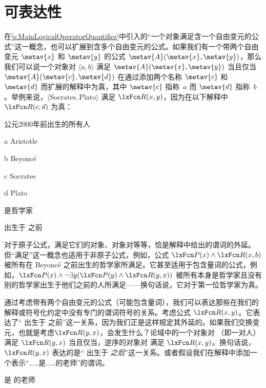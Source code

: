 \section{可表达性}

在\cref{s:MainLogicalOperatorQuantifier}中引入的“一个对象满足含一个自由变元的公式”这一概念，也可以扩展到含多个自由变元的公式。如果我们有一个带两个自由变元
$\metav{x}$ 和 $\metav{y}$ 的公式 $\metav{A}(\metav{x},\metav{y})$，那么我们可以说一个对象对
$\langle a, b\rangle$ 满足 $\metav{A}(\metav{x},\metav{y})$
当且仅当$\metav{A}(\metav{c},\metav{d})$ 在通过添加两个名称 $\metav{c}$ 和 $\metav{d}$ 而扩展的解释中为真，其中 $\metav{c}$ 指称~$a$ 而 $\metav{d}$ 指称~$b$。举例来说，$\langle \text{Socrates}, \text{Plato}\rangle$ 满足
$\atom{R}{x,y}$，因为在以下解释中 $\atom{R}{c,d}$ 为真：

\begin{ekey}
	\item[\text{论域}] 公元2000年前出生的所有人
	\item[a] Aristotle
	\item[b] Beyonc\'e
	\item[c] Socrates
	\item[d] Plato
	\item[\atom{P}{x}]  是哲学家
	\item[\atom{R}{x,y}]  出生于  之前
\end{ekey}


对于原子公式，满足它们的对象、对象对等等，恰是解释中给出的谓词的外延。但“满足”这一概念也适用于非原子公式，例如，公式 $\atom{P}{x} \land \atom{R}{x,b}$ 被所有在 Beyonc\'e 之前出生的哲学家所满足。它甚至适用于包含量词的公式，例如，$\atom{P}{x} \eand \lnot\exists y(\atom{P}{y} \land \atom{R}{y,x})$ 被所有本身是哲学家且没有别的哲学家出生于他们之前的人所满足——换句话说，它对于第一位哲学家为真。

通过考虑带有两个自由变元的公式（可能包含量词），我们可以表达那些在我们的解释或符号化约定中没有专门的谓词符号的关系。考虑公式 $\atom{R}{x,y}$。它表达了“ 出生于  之前”这一关系，因为我们正是这样规定其外延的。如果我们交换变元，也就是考虑$\atom{R}{y,x}$，会发生什么？论域中的一个对象对 （即一对人）满足 $\atom{R}{y,x}$ 当且仅当，逆序的对象对  满足 $\atom{R}{x,y}$。换句话说，$\atom{R}{y,x}$ 表达的是“ 出生于 \emph{之后}”这一关系。或者假设我们在解释中添加一个表示“……是……的老师”的谓词。


\begin{ekey}
	\item[\atom{T}{x,y}]  是  的老师
\end{ekey}


